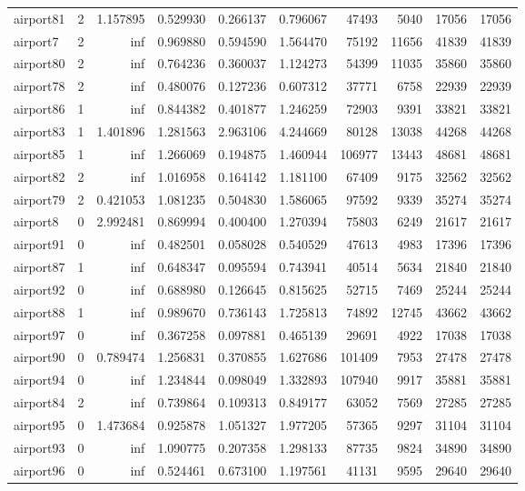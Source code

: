 \begin{longtable}{|l|r|r|r|r|r|r|r|r|r|}
airport81 & 2 & 1.157895 & 0.529930 & 0.266137 & 0.796067 & 47493 & 5040 & 17056 & 17056 \\
airport7 & 2 & inf & 0.969880 & 0.594590 & 1.564470 & 75192 & 11656 & 41839 & 41839 \\
airport80 & 2 & inf & 0.764236 & 0.360037 & 1.124273 & 54399 & 11035 & 35860 & 35860 \\
airport78 & 2 & inf & 0.480076 & 0.127236 & 0.607312 & 37771 & 6758 & 22939 & 22939 \\
airport86 & 1 & inf & 0.844382 & 0.401877 & 1.246259 & 72903 & 9391 & 33821 & 33821 \\
airport83 & 1 & 1.401896 & 1.281563 & 2.963106 & 4.244669 & 80128 & 13038 & 44268 & 44268 \\
airport85 & 1 & inf & 1.266069 & 0.194875 & 1.460944 & 106977 & 13443 & 48681 & 48681 \\
airport82 & 2 & inf & 1.016958 & 0.164142 & 1.181100 & 67409 & 9175 & 32562 & 32562 \\
airport79 & 2 & 0.421053 & 1.081235 & 0.504830 & 1.586065 & 97592 & 9339 & 35274 & 35274 \\
airport8 & 0 & 2.992481 & 0.869994 & 0.400400 & 1.270394 & 75803 & 6249 & 21617 & 21617 \\
airport91 & 0 & inf & 0.482501 & 0.058028 & 0.540529 & 47613 & 4983 & 17396 & 17396 \\
airport87 & 1 & inf & 0.648347 & 0.095594 & 0.743941 & 40514 & 5634 & 21840 & 21840 \\
airport92 & 0 & inf & 0.688980 & 0.126645 & 0.815625 & 52715 & 7469 & 25244 & 25244 \\
airport88 & 1 & inf & 0.989670 & 0.736143 & 1.725813 & 74892 & 12745 & 43662 & 43662 \\
airport97 & 0 & inf & 0.367258 & 0.097881 & 0.465139 & 29691 & 4922 & 17038 & 17038 \\
airport90 & 0 & 0.789474 & 1.256831 & 0.370855 & 1.627686 & 101409 & 7953 & 27478 & 27478 \\
airport94 & 0 & inf & 1.234844 & 0.098049 & 1.332893 & 107940 & 9917 & 35881 & 35881 \\
airport84 & 2 & inf & 0.739864 & 0.109313 & 0.849177 & 63052 & 7569 & 27285 & 27285 \\
airport95 & 0 & 1.473684 & 0.925878 & 1.051327 & 1.977205 & 57365 & 9297 & 31104 & 31104 \\
airport93 & 0 & inf & 1.090775 & 0.207358 & 1.298133 & 87735 & 9824 & 34890 & 34890 \\
airport96 & 0 & inf & 0.524461 & 0.673100 & 1.197561 & 41131 & 9595 & 29640 & 29640 \\

\end{longtable}
